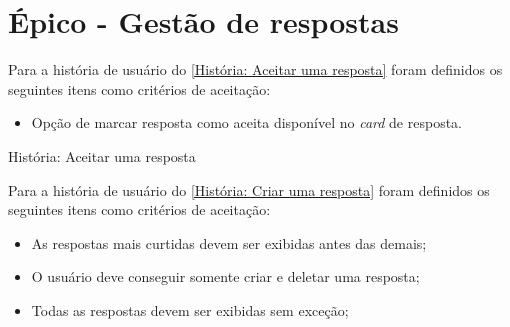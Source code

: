 \section{Épico - Gestão de respostas}
\label{gestão_respostas}
Para a história de usuário do \autoref{História: Aceitar uma resposta} foram definidos os seguintes itens como critérios de aceitação:

\begin{itemize}
\item Opção de marcar resposta como aceita disponível no \textit{card} de resposta. 
\end{itemize}

\def\arraystretch{2}
\begin{quadro}[htb]
\centering
\ABNTEXfontereduzida
\caption[História: Aceitar uma resposta]{História: Aceitar uma resposta}
\label{História: Aceitar uma resposta}
\end{quadro}
\FloatBarrier 

Para a história de usuário do \autoref{História: Criar uma resposta} foram definidos os seguintes itens como critérios de aceitação:

\begin{itemize}
\item As respostas mais curtidas devem ser exibidas antes das demais;
\item O usuário deve conseguir somente criar e deletar uma resposta;
\item Todas as respostas devem ser exibidas sem exceção;
\end{itemize}

